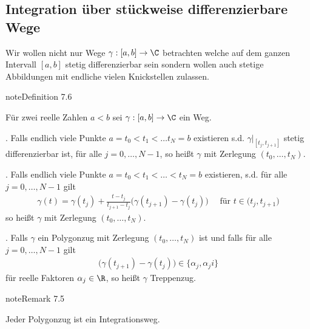 \documentclass[letterpaper,10pt,german]{jupyterBook}
\begin{document}
\subsection{Integration über stückweise differenzierbare Wege}
\label{\detokenize{complexanalysis/kurvenintegrale:integration-uber-stuckweise-differenzierbare-wege}}
\sphinxAtStartPar
Wir wollen nicht nur Wege \(\gamma:[a,b]\to\C\) betrachten welche auf dem ganzen Intervall \([a,b]\) stetig differenzierbar sein sondern wollen auch stetige Abbildungen mit endliche vielen Knickstellen zulassen.
\label{complexanalysis/kurvenintegrale:definition-5}
\begin{sphinxadmonition}{note}{Definition 7.6}



\sphinxAtStartPar
Für zwei reelle Zahlen \(a<b\) sei \(\gamma:[a,b]\to\C\) ein Weg.

. Falls endlich viele Punkte \(a=t_0<t_1<\ldots t_N =b\) existieren s.d. \(\gamma\rvert_{[t_j,t_{j+1}]}\) stetig differenzierbar ist, für alle \(j=0,\ldots, N-1\), so heißt \(\gamma\)  mit Zerlegung \((t_0,\ldots,t_N)\).

. Falls endlich viele Punkte \(a=t_0<t_1<\ldots < t_N =b\) existieren, s.d. für alle \(j=0,\ldots, N-1\) gilt
\begin{equation*}
\begin{split}\gamma(t) = \gamma(t_j) + \frac{t - t_j}{t_{j+1} - t_j} \big(\gamma(t_{j+1}) - \gamma(t_j))\quad\text{ für } t\in(t_j,t_{j+1}\big)\end{split}
\end{equation*}
\sphinxAtStartPar
so heißt \(\gamma\)  mit Zerlegung \((t_0,\ldots,t_N)\).

. Falls \(\gamma\) ein Polygonzug mit Zerlegung \((t_0,\ldots,t_N)\) ist und falls für alle \(j=0,\ldots,N-1\) gilt
\begin{equation*}
\begin{split}\big(\gamma(t_{j+1}) - \gamma(t_j)) \in \{ \alpha_j, \alpha_j i\}\end{split}
\end{equation*}
\sphinxAtStartPar
für reelle Faktoren \(\alpha_j\in\R\), so heißt \(\gamma\) Treppenzug.
\end{sphinxadmonition}
\label{complexanalysis/kurvenintegrale:remark-6}
\begin{sphinxadmonition}{note}{Remark 7.5}



\sphinxAtStartPar
Jeder Polygonzug ist ein Integrationsweg.
\end{sphinxadmonition}
\end{document}
